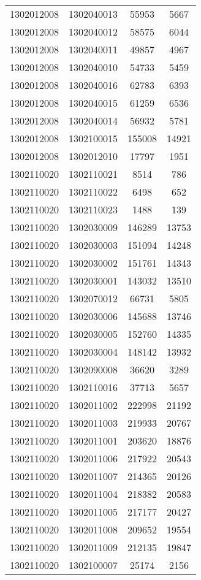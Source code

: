 \begin{longtable}{llcc}
1302012008 & 1302040013 & 55953 & 5667\\
1302012008 & 1302040012 & 58575 & 6044\\
1302012008 & 1302040011 & 49857 & 4967\\
1302012008 & 1302040010 & 54733 & 5459\\
1302012008 & 1302040016 & 62783 & 6393\\
1302012008 & 1302040015 & 61259 & 6536\\
1302012008 & 1302040014 & 56932 & 5781\\
1302012008 & 1302100015 & 155008 & 14921\\
1302012008 & 1302012010 & 17797 & 1951\\
1302110020 & 1302110021 & 8514 & 786\\
1302110020 & 1302110022 & 6498 & 652\\
1302110020 & 1302110023 & 1488 & 139\\
1302110020 & 1302030009 & 146289 & 13753\\
1302110020 & 1302030003 & 151094 & 14248\\
1302110020 & 1302030002 & 151761 & 14343\\
1302110020 & 1302030001 & 143032 & 13510\\
1302110020 & 1302070012 & 66731 & 5805\\
1302110020 & 1302030006 & 145688 & 13746\\
1302110020 & 1302030005 & 152760 & 14335\\
1302110020 & 1302030004 & 148142 & 13932\\
1302110020 & 1302090008 & 36620 & 3289\\
1302110020 & 1302110016 & 37713 & 5657\\
1302110020 & 1302011002 & 222998 & 21192\\
1302110020 & 1302011003 & 219933 & 20767\\
1302110020 & 1302011001 & 203620 & 18876\\
1302110020 & 1302011006 & 217922 & 20543\\
1302110020 & 1302011007 & 214365 & 20126\\
1302110020 & 1302011004 & 218382 & 20583\\
1302110020 & 1302011005 & 217177 & 20427\\
1302110020 & 1302011008 & 209652 & 19554\\
1302110020 & 1302011009 & 212135 & 19847\\
1302110020 & 1302100007 & 25174 & 2156\\

\end{longtable}
